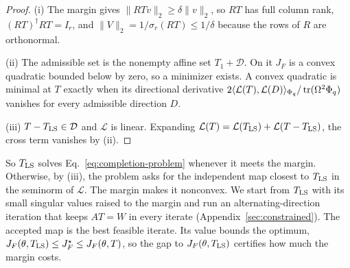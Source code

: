 \begin{proof}
(i) The margin gives $\|RTv\|_2\ge\delta\|v\|_2$, so $RT$ has full column
rank, $(RT)^{\dagger}RT=I_r$, and $\|V\|_2=1/\sigma_r(RT)\le1/\delta$
because the rows of $R$ are orthonormal.

(ii) The admissible set is the nonempty affine set $T_1+\mathcal D$. On it
$J_F$ is a convex quadratic bounded below by zero, so a minimizer exists.
A convex quadratic is minimal at $T$ exactly when its directional
derivative $2\langle\mathcal L(T),\mathcal L(D)\rangle_{\Phi_q}/\operatorname{tr}(\Omega^2\Phi_q)$
vanishes for every admissible direction $D$.

(iii) $T-T_{\rm LS}\in\mathcal D$ and $\mathcal L$ is linear. Expanding
$\mathcal L(T)=\mathcal L(T_{\rm LS})+\mathcal L(T-T_{\rm LS})$, the cross
term vanishes by (ii).
\end{proof}

So $T_{\rm LS}$ solves Eq.~\eqref{eq:completion-problem} whenever it meets
the margin. Otherwise, by (iii), the problem asks for the independent map
closest to $T_{\rm LS}$ in the seminorm of $\mathcal L$. The margin makes it
nonconvex. We start from $T_{\rm LS}$ with its small singular values raised
to the margin and run an alternating-direction iteration that keeps $AT=W$
in every iterate (Appendix~\ref{sec:constrained}). The accepted map is the
best feasible iterate. Its value bounds the optimum,
$J_F(\theta,T_{\rm LS})\le J_F^\star\le J_F(\theta,T)$, so the gap to
$J_F(\theta,T_{\rm LS})$ certifies how much the margin costs.
